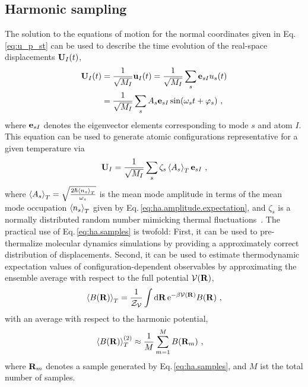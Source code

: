 \subsection{Harmonic sampling}
The solution to the equations of motion for the normal coordinates given in Eq.\,\eqref{eq:u_p_st} can be used to describe the time evolution of the real-space displacements ${\bf U}_I (t)$,
\begin{align}
	{\bf U}_I (t) 
		&= \frac{1}{\sqrt{M_I}} {\bf u}_I (t) 
		= \frac{1}{\sqrt{M_I}} \sum_s {\bf e}_{sI} u_s (t) \\
		&= \frac{1}{\sqrt{M_I}} \sum_s  A_s {\bf e}_{sI} \sin (\omega_s t + \varphi_s)~,
\end{align}
where ${\bf e}_{sI}$ denotes the eigenvector elements corresponding to mode $s$ and atom $I$. This equation can be used to generate atomic configurations representative for a given temperature via
\begin{align}
	{\bf U}_I = \frac{1}{\sqrt{M_I}} \sum_s  \zeta_s \braket{A_s}_T \b e_{sI}~,
	\label{eq:ha.samples}
\end{align}
where $\braket{A_s}_T = \sqrt{\frac{2 \hbar \braket{n_s}_T}{\omega_s}}$ is the mean mode amplitude in terms of the mean mode occupation $\braket{n_s}_T$ given by Eq.\,\eqref{eq:ha.amplitude.expectation}, and $\zeta_s$ is a normally distributed random number mimicking thermal fluctuations~\cite{West2006}. The practical use of Eq.\,\eqref{eq:ha.samples} is twofold: First, it can be used to pre-thermalize molecular dynamics simulations by providing a approximately correct distribution of displacements. Second, it can be used to estimate thermodynamic expectation values of configuration-dependent observables by approximating the ensemble average with respect to the full potential $\mathcal V ({\bf R})$,
\begin{align}
	\braket{B ({\bf R})}_T
		= \frac{1}{\mathcal{Z}_{\mathcal{V}}} \int \d {\bf R} \,{\rm e}^{- \beta \mathcal V ({\bf R})} B({\bf R})~,
	\label{eq:ha.expectation.0}
\end{align}
with an average with respect to the harmonic potential,
\begin{align}
	\braket{B ({\bf R})}_T^{(2)}
		&\approx  \frac{1}{M} \sum\limits_{m=1}^{M} B({\bf R}_m)~,
\label{eq:ha.expectation.1}
\end{align}
where ${\bf R}_m$ denotes a sample generated by Eq.\,\eqref{eq:ha.samples}, and $M$ ist the total number of samples.



